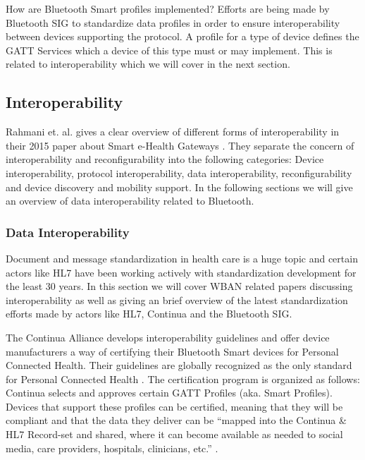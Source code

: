 How are Bluetooth Smart profiles implemented? Efforts are being made by Bluetooth SIG to standardize data profiles in order to ensure interoperability between devices supporting the protocol. A profile for a type of device defines the GATT Services which a device of this type must or may implement. This is related to interoperability which we will cover in the next section.


\subsection{Interoperability} %
\label{sub:interoperability}

Rahmani et. al. gives a clear overview of different forms of interoperability in their 2015 paper about Smart e-Health Gateways \cite{DrAmirMohammadRahmani:2014vx}. They separate the concern of interoperability and reconfigurability into the following categories: Device interoperability, protocol interoperability, data interoperability, reconfigurability and device discovery and mobility support. In the following sections we will give an overview of data interoperability related to Bluetooth.

\subsubsection{Data Interoperability} %
\label{ssub:data_interoperability}


Document and message standardization in health care is a huge topic and certain actors like HL7 have been working actively with standardization development for the least 30 years. In this section we will cover WBAN related papers discussing interoperability as well as giving an brief overview of the latest standardization efforts made by actors like HL7, Continua and the Bluetooth SIG.

The Continua Alliance develops interoperability guidelines and offer device manufacturers a way of certifying their Bluetooth Smart devices for Personal Connected Health. Their guidelines are globally recognized as the only standard for Personal Connected Health \cite{newRef:27}. The certification program is organized as follows: Continua selects and approves certain GATT Profiles (aka. Smart Profiles). Devices that support these profiles can be certified, meaning that they will be compliant and that the data they deliver can be ``mapped into the Continua & HL7 Record-set and shared, where it can become available as needed to social media, care providers, hospitals, clinicians, etc.'' \cite{newRef:27}.

